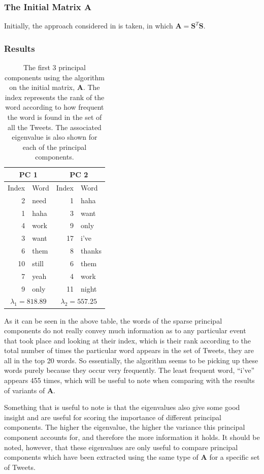 \documentclass[11pt,a4paper]{article}
\newcommand{\covmat}{\mathbf{A}}
\begin{document}
\subsubsection{The Initial Matrix $\mathbf{A}$}
Initially, the approach considered in \cite{dimakis} is taken, in which $\mathbf{A} = \mathbf{S}^T \mathbf{S}$. 

\subsubsection*{Results}
\begin{table}[H]
\center
\begin{tabular}{| r| l | r| l |}
\hline
\multicolumn{2}{|c|}{PC 1} & \multicolumn{2}{|c|}{PC 2}
\\
\hline
Index & Word & Index & Word\\
\hline
2 & need & 1 & haha \\
1 & haha & 3 & want \\
4 & work & 9 &only\\
3 & want & 17 & i've\\
6 & them & 8 & thanks\\
10 & still& 6 & them\\ 
7 & yeah & 4 & work\\
9 & only & 11 & night\\
\hline
\multicolumn{2}{|c|}{ $\lambda_1 = 818.89$}  & \multicolumn{2}{|c|}{ $\lambda_2 = 557.25$}  \\
\hline
\end{tabular}
\caption{The first 3 principal components using the algorithm on the initial matrix, $ \mathbf{A}$. The index represents the rank of the word according to how frequent the word is found in the set of all the Tweets. The associated eigenvalue is also shown for each of the principal components.}
\end{table}

As it can be seen in the above table, the words of the sparse principal components do not really convey much information as to any particular event that took place and looking at their index, which is their rank according to the total number of times the particular word appears in the set of Tweets, they are all in the top 20 words. So essentially, the algorithm seems to be picking up these words purely because they occur very frequently. The least frequent word, ``i've'' appears 455 times, which will be useful to note when comparing with the results of variants of $\covmat$.

Something that is useful to note is that the eigenvalues also give some good insight and are useful for scoring the importance of different principal components. The higher the eigenvalue, the higher the variance this principal component accounts for, and therefore the more information it holds. It should be noted, however, that these eigenvalues are only useful to compare principal components which have been extracted using the same type of $\covmat$ for a specific set of Tweets.
\end{document}
